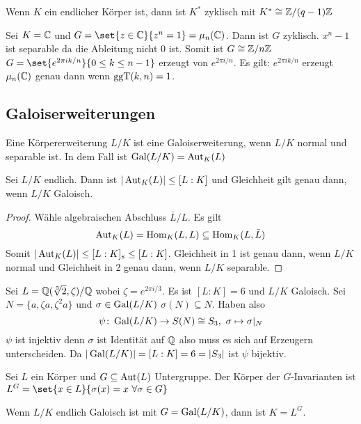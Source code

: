 \begin{Kor}
    Wenn $K$ ein endlicher Körper ist, dann ist $K^*$ zyklisch mit $K^*\cong \mathbb{Z}/(q-1)\mathbb{Z}$
\end{Kor}
\begin{Bsp}
    Sei $K=\mathbb{C}$ und $G=\set{z\in\CC}{ z^n=1}=\mu_n(\CC)$. Dann ist $G$ zyklisch. $x^n-1$ ist separable da die Ableitung nicht $0$ ist. Somit ist $G\cong \mathbb{Z}/n\mathbb{Z}$ $G=\set{e^{2\pi i k/n}}{ 0\leq k\leq n-1}$ erzeugt von $e^{2\pi i/n}$. 
    Es gilt: $e^{2\pi i k/n}$ erzeugt $\mu_n(\mathbb{C})$ genau dann wenn $\operatorname{ggT}(k,n)=1$.
\end{Bsp}
\subsection{Galoiserweiterungen}
\begin{Def}
    Eine Körpererweiterung $L/K$ ist eine Galoiserweiterung, wenn $L/K$ normal und separable ist. In dem Fall ist $\operatorname{Gal}(L/K)=\operatorname{Aut}_K(L)$
\end{Def}
\begin{Satz}
    Sei $L/K$ endlich. Dann ist $|\operatorname{Aut}_K(L)|\leq [L:K]$ und Gleichheit gilt genau dann, wenn $L/K$ Galoisch.
\end{Satz}
\begin{proof}
    Wähle algebraischen Abschluss $\bar L/L$. Es gilt 
    $$\operatorname{Aut}_K(L)=\operatorname{Hom}_K(L,L)\subseteq \operatorname{Hom}_K(L,\bar L)$$
    Somit $|\operatorname{Aut}_K(L)|\leq [L:K]_s\leq [L:K]$.
    Gleichheit in 1 ist genau dann, wenn $L/K$ normal und Gleichheit in 2 genau dann, wenn $L/K$ separable.
\end{proof}
\begin{Bsp}
    Sei $L=\mathbb{Q}(\sqrt[3]{2},\zeta)/\mathbb{Q}$ wobei $\zeta=e^{2\pi i/3}$. Es ist $[L:K]=6$ und $L/K$ Galoisch. Sei $N=\{a,\zeta a,\zeta^2 a\}$ und $\sigma\in\operatorname{Gal}(L/K)$ $\sigma(N)\subseteq N$. Haben also 
    $$\psi\colon \operatorname{Gal}(L/K)\to S(N)\cong S_3,\ \sigma\mapsto \sigma|_N$$
    $\psi$ ist injektiv denn $\sigma$ ist Identität auf $\mathbb{Q}$ also muss es sich auf Erzeugern unterscheiden. Da $|\operatorname{Gal}(L/K)|=[L:K]=6=|S_3|$ ist $\psi$ bijektiv.
\end{Bsp}
\begin{Def}
    Sei $L$ ein Körper und $G\subseteq \operatorname{Aut}(L)$ Untergruppe.
    Der Körper der $G$-Invarianten ist $L^G=\set{x\in L}{\sigma(x)=x\ \forall \sigma\in G}$
\end{Def}
\begin{Lemma}\label{Lem:Galois1}
    Wenn $L/K$ endlich Galoisch ist mit $G=\operatorname{Gal}(L/K)$, dann ist $K=L^G$.
\end{Lemma}
